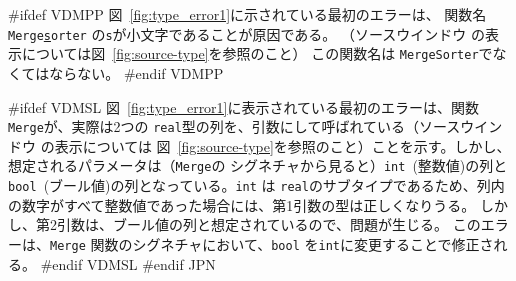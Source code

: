 \documentclass[\pformat,12pt]{article}
\newcommand{\guicmd}[1]{{\sf #1}}
\newcommand{\guicmd}[1]{{\gt #1}}
\begin{document}
#ifdef VDMPP
図~\ref{fig:type_error1}に示されている最初のエラーは、
関数名{\tt Merge\underline{s}orter} の{\tt s}が小文字であることが原因である。
（\guicmd{ソースウインドウ} の表示については図~\ref{fig:source-type}を参照のこと）
この関数名は {\tt MergeSorter}でなくてはならない。
#endif VDMPP

#ifdef VDMSL 
図~\ref{fig:type_error1}に表示されている最初のエラーは、関数{\tt Merge}が、実際は2つの
{\tt real}型の列を、引数にして呼ばれている（\guicmd{ソースウインドウ} の表示については
図~\ref{fig:source-type}を参照のこと）ことを示す。しかし、想定されるパラメータは（{\tt Merge}の
シグネチャから見ると）{\tt int}~(整数値)の列と {\tt bool}~(ブール値)の列となっている。{\tt int} は
{\tt real}のサブタイプであるため、列内の数字がすべて整数値であった場合には、第1引数の型は正しくなりうる。
しかし、第2引数は、ブール値の列と想定されているので、問題が生じる。
このエラーは、{\tt Merge} 関数のシグネチャにおいて、{\tt bool} を{\tt int}に変更することで修正される。
#endif VDMSL
#endif JPN
\end{document}
